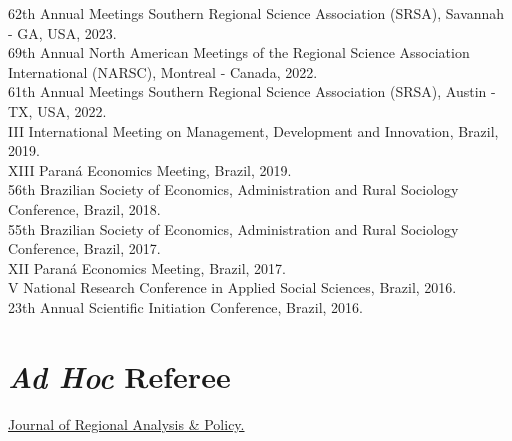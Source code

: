 \documentclass[letterpaper,11pt]{article}
\newcommand{\resumeSubHeadingListStart}{\begin{itemize}[leftmargin=0.15in, label={}]}
\newcommand{\resumeSubHeadingListEnd}{\end{itemize}}
\begin{document}
  \resumeSubHeadingListStart
    \small{\item{
        {62th Annual Meetings Southern Regional Science Association (SRSA), Savannah - GA, USA, 2023.} \\ \vspace{2pt}
        {69th Annual North American Meetings of the Regional Science Association International (NARSC), Montreal - Canada, 2022.} \\ \vspace{2pt}
        {61th Annual Meetings Southern Regional Science Association (SRSA), Austin - TX, USA, 2022.} \\ \vspace{2pt}
        {III International Meeting on Management, Development and Innovation, Brazil, 2019.} \\ \vspace{2pt}
        {XIII Paraná Economics Meeting, Brazil, 2019.} \\ \vspace{2pt}
        {56th Brazilian Society of Economics, Administration and Rural Sociology Conference, Brazil, 2018.} \\ \vspace{2pt}
        {55th Brazilian Society of Economics, Administration and Rural Sociology Conference, Brazil, 2017.} \\ \vspace{2pt}
        {XII Paraná Economics Meeting, Brazil, 2017.} \\ \vspace{2pt}
        {V National Research Conference in Applied Social Sciences, Brazil, 2016.} \\ \vspace{2pt}
        {23th Annual Scientific Initiation Conference, Brazil, 2016.} \\ \vspace{2pt}
    }}
  \resumeSubHeadingListEnd


\section{\textit{Ad Hoc} Referee}
\vspace{3pt}

  \resumeSubHeadingListStart
    \small{\item{
        {\href{https://jrap.scholasticahq.com/}{Journal of Regional Analysis \& Policy.}}{} \\ \vspace{2pt}
    }}
  \resumeSubHeadingListEnd
\end{document}
